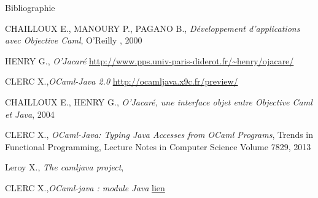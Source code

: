 \documentclass[xcolor={table,dvipsnames}]{beamer}
\begin{document}
\begin{frame}{Bibliographie}

  \begin{thebibliography}{}
   CHAILLOUX E., MANOURY P., PAGANO B., \emph{Développement
    d'applications avec Objective Caml}, O'Reilly
    , 2000

  \bibitem{}  HENRY G., \emph{O’Jacaré} \url{http://www.pps.univ-paris-diderot.fr/~henry/ojacare/}

  \bibitem{}  CLERC X.,\emph{OCaml-Java 2.0} \url{http://ocamljava.x9c.fr/preview/}

  \bibitem{} CHAILLOUX E., HENRY G., \emph{O’Jacaré, une interface objet
    entre Objective Caml et Java}, 2004

  \bibitem{} CLERC X., \emph{OCaml-Java: Typing Java Accesses from OCaml
    Programs}, Trends in Functional Programming, Lecture Notes in
    Computer Science Volume 7829,
    2013

   Leroy X., \emph{The camljava project},

   CLERC X.,\emph{OCaml-java : module Java} \href{http://ocamljava.x9c.fr/preview/javalib/index.html}{lien}

  \end{thebibliography}
\end{frame}
\end{document}
